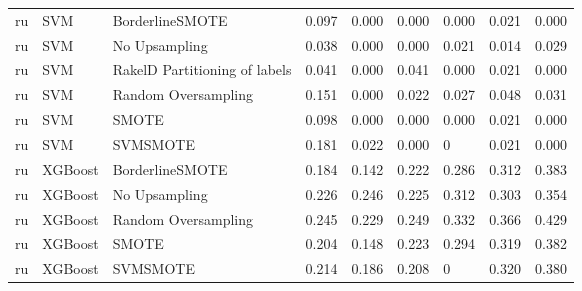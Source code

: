 \begin{tabular}{lllllllll}
      ru &                             SVM &               BorderlineSMOTE & 0.097 &                     0.000 &                 0.000 &                  0.000 &                                   0.021 &     0.000 \\
      ru &                             SVM &                 No Upsampling & 0.038 &                     0.000 &                 0.000 &                  0.021 &                                   0.014 &     0.029 \\
      ru &                             SVM & RakelD Partitioning of labels & 0.041 &                     0.000 &                 0.041 &                  0.000 &                                   0.021 &     0.000 \\
      ru &                             SVM &           Random Oversampling & 0.151 &                     0.000 &                 0.022 &                  0.027 &                                   0.048 &     0.031 \\
      ru &                             SVM &                         SMOTE & 0.098 &                     0.000 &                 0.000 &                  0.000 &                                   0.021 &     0.000 \\
      ru &                             SVM &                      SVMSMOTE & 0.181 &                     0.022 &                 0.000 &                      0 &                                   0.021 &     0.000 \\
      ru &                         XGBoost &               BorderlineSMOTE & 0.184 &                     0.142 &                 0.222 &                  0.286 &                                   0.312 &     0.383 \\
      ru &                         XGBoost &                 No Upsampling & 0.226 &                     0.246 &                 0.225 &                  0.312 &                                   0.303 &     0.354 \\
      ru &                         XGBoost &           Random Oversampling & 0.245 &                     0.229 &                 0.249 &                  0.332 &                                   0.366 &     0.429 \\
      ru &                         XGBoost &                         SMOTE & 0.204 &                     0.148 &                 0.223 &                  0.294 &                                   0.319 &     0.382 \\
      ru &                         XGBoost &                      SVMSMOTE & 0.214 &                     0.186 &                 0.208 &                      0 &                                   0.320 &     0.380 \\
\bottomrule
\end{tabular}

